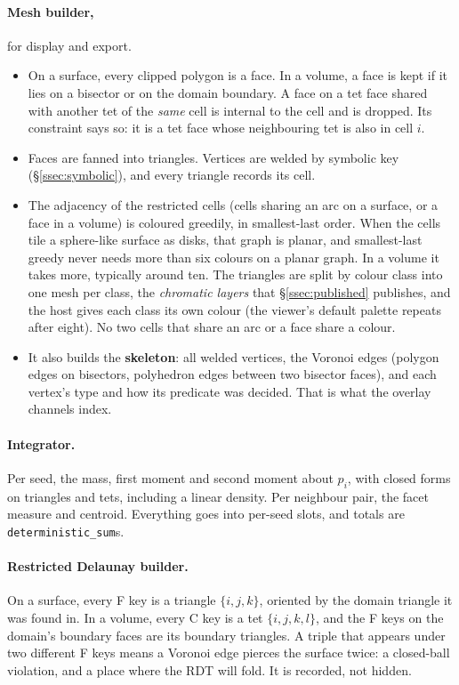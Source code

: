 \documentclass[11pt,a4paper]{article}
\newcommand{\code}[1]{\texttt{#1}}          %
\newcommand{\secref}[1]{\S\ref{#1}}
\begin{document}
\paragraph{Mesh builder,} for display and export.
\begin{itemize}
\item On a surface, every clipped polygon is a face. In a volume, a face is kept if it lies on a
  bisector or on the domain boundary. A face on a tet face shared with another tet of the
  \emph{same} cell is internal to the cell and is dropped. Its constraint says so: it is a tet
  face whose neighbouring tet is also in cell $i$.
\item Faces are fanned into triangles. Vertices are welded by symbolic key
  (\secref{ssec:symbolic}), and every triangle records its cell.
\item The adjacency of the restricted cells (cells sharing an arc on a surface, or a face in a
  volume) is coloured greedily, in smallest-last order. When the cells tile a sphere-like
  surface as disks, that graph is planar, and smallest-last greedy never needs more than six
  colours on a planar graph. In a volume it takes more, typically around ten. The triangles are split by
  colour class into one mesh per class, the \emph{chromatic layers} that \secref{ssec:published}
  publishes, and the host gives each class its own colour (the viewer's default palette repeats
  after eight). No two cells that share an arc or a face share a colour.
\item It also builds the \textbf{skeleton}: all welded vertices, the Voronoi edges (polygon edges
  on bisectors, polyhedron edges between two bisector faces), and each vertex's type and how its
  predicate was decided. That is what the overlay channels index.
\end{itemize}

\paragraph{Integrator.} Per seed, the mass, first moment and second moment about $p_i$, with
closed forms on triangles and tets, including a linear density. Per neighbour pair, the facet
measure and centroid. Everything goes into per-seed slots, and totals are
\code{deterministic\_sum}s.

\paragraph{Restricted Delaunay builder.} On a surface, every F key is a triangle $\{i,j,k\}$,
oriented by the domain triangle it was found in. In a volume, every C key is a tet
$\{i,j,k,l\}$, and the F keys on the domain's boundary faces are its boundary triangles. A triple
that appears under two different F keys means a Voronoi edge pierces the surface twice: a
closed-ball violation, and a place where the RDT will fold. It is recorded, not hidden.
\end{document}
